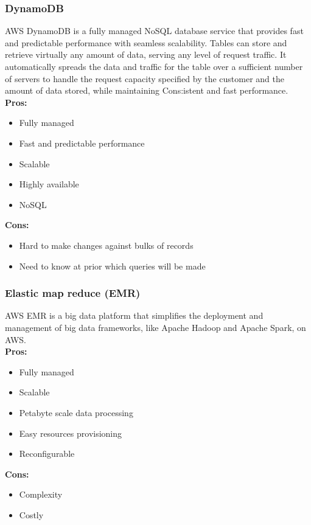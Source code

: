         \subsubsection{DynamoDB}
        \label{aws:dynamodb}
        AWS DynamoDB is a fully managed NoSQL database service that provides fast and predictable performance with seamless scalability.
        Tables can store and retrieve virtually any amount of data, serving any level of request traffic.
        It automatically spreads the data and traffic for the table over a sufficient number of servers to handle the request capacity specified by the customer and the amount of data stored, while maintaining Cons:istent and fast performance.\\
        \textbf{Pros:}
        \begin{itemize}
            \item Fully managed
            \item Fast and predictable performance
            \item Scalable
            \item Highly available
            \item NoSQL
        \end{itemize}
        \textbf{Cons:}
        \begin{itemize}
            \item Hard to make changes against bulks of records
            \item Need to know at prior which queries will be made
        \end{itemize}

        \subsubsection{Elastic map reduce (EMR)}
        \label{aws:emr}
        AWS EMR is a big data platform that simplifies the deployment and management of big data frameworks, like Apache Hadoop and Apache Spark, on AWS.\\
        \textbf{Pros:}
        \begin{itemize}
            \item Fully managed
            \item Scalable
            \item Petabyte scale data processing
            \item Easy resources provisioning
            \item Reconfigurable
        \end{itemize}
        \textbf{Cons:}
        \begin{itemize}
            \item Complexity
            \item Costly
        \end{itemize}

